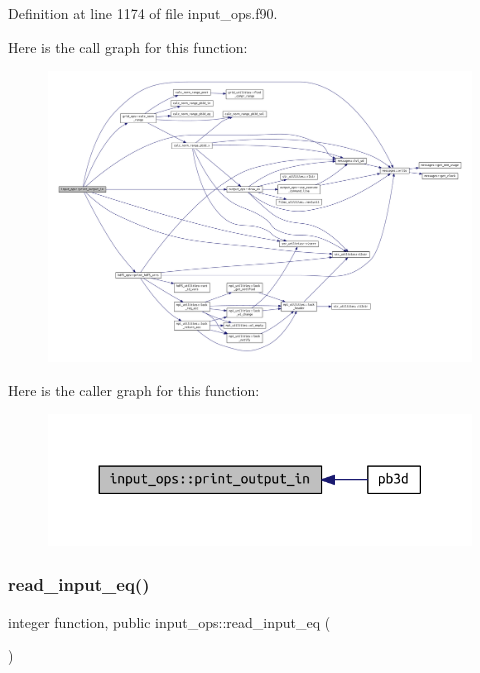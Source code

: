 Definition at line 1174 of file input\+\_\+ops.\+f90.

Here is the call graph for this function\+:\nopagebreak
\begin{figure}[H]
\begin{center}
\leavevmode
\includegraphics[width=350pt]{namespaceinput__ops_a6a1237ee3005ebd6f4978e7092ab2dc5_cgraph}
\end{center}
\end{figure}
Here is the caller graph for this function\+:\nopagebreak
\begin{figure}[H]
\begin{center}
\leavevmode
\includegraphics[width=330pt]{namespaceinput__ops_a6a1237ee3005ebd6f4978e7092ab2dc5_icgraph}
\end{center}
\end{figure}
\mbox{\label{namespaceinput__ops_a577c897cc266961eb40bb5ef747fa077}} 
\subsubsection{\texorpdfstring{read\+\_\+input\+\_\+eq()}{read\_input\_eq()}}
{\footnotesize\ttfamily integer function, public input\+\_\+ops\+::read\+\_\+input\+\_\+eq (\begin{DoxyParamCaption}{ }\end{DoxyParamCaption})}



